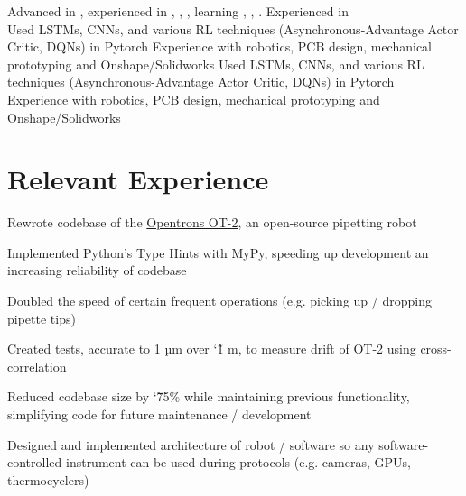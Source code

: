 \documentclass[]{deedy-resume-openfont}
\begin{document}

\begin{minipage}[t]{\textwidth}
   Advanced in , experienced in , , , learning , , . Experienced in \\
  \ifdef{\software} {
     Used LSTMs, CNNs, and various RL techniques (Asynchronous-Advantage Actor Critic, DQNs) in Pytorch
  } {
    \ifdef{\robotics} {
       Experience with robotics, PCB design, mechanical prototyping and Onshape/Solidworks
    } { 
       Used LSTMs, CNNs, and various RL techniques (Asynchronous-Advantage Actor Critic, DQNs) in Pytorch \\
       Experience with robotics, PCB design, mechanical prototyping and Onshape/Solidworks
    }
  }
\end{minipage}

\vspace{12pt}

\section{Relevant Experience}

\begin{tightemize}
    \item Rewrote codebase of the \href{https://opentrons.com/ot-2/}{Opentrons OT-2}, an open-source pipetting robot
    \ifdef{\software} {
      \item Implemented Python's Type Hints with MyPy, speeding up development an increasing reliability of codebase
    } {}
    \item Doubled the speed of certain frequent operations (e.g. picking up / dropping pipette tips)
    \item Created tests, accurate to 1 µm over \char`\~ 1 m, to measure drift of OT-2 using cross-correlation
    \item Reduced codebase size by \char`\~ 75\% while maintaining previous functionality, simplifying code for future maintenance / development
    \item Designed and implemented architecture of robot / software so any software-controlled instrument can be used during protocols (e.g. cameras, GPUs, thermocyclers)
\end{tightemize}
\end{document}
